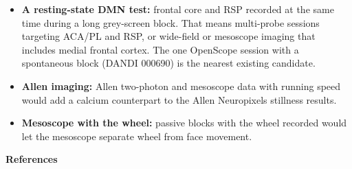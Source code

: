 \documentclass[10pt,a4paper]{article}
\begin{document}
\begin{itemize}
\item \textbf{A resting-state DMN test:} frontal core and RSP recorded at the same time during a long grey-screen block. That means multi-probe sessions targeting ACA/PL and RSP, or wide-field or mesoscope imaging that includes medial frontal cortex. The one OpenScope session with a spontaneous block (DANDI 000690) is the nearest existing candidate.
\item \textbf{Allen imaging:} Allen two-photon and mesoscope data with running speed would add a calcium counterpart to the Allen Neuropixels stillness results.
\item \textbf{Mesoscope with the wheel:} passive blocks with the wheel recorded would let the mesoscope separate wheel from face movement.
\end{itemize}
\bigskip
{\LARGE\bfseries References}\par\smallskip{\color{accent}\rule{\linewidth}{0.8pt}}\par\medskip
\end{document}
